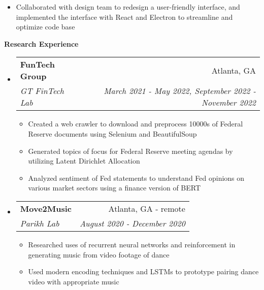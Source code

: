 \documentclass[letterpaper,10pt]{article}
\makeatletter
\newcommand{\resitem}[1]{\item #1 \vspace{-3.5pt}}
\newcommand{\resheading}[1]{{\large \colorbox{mygrey}{\begin{minipage}{\textwidth}{\textbf{#1 \vphantom{p\^{E}}}}\end{minipage}}}}
\newcommand{\ressubheading}[4]{
\begin{tabular*}{7.0in}{l@{\extracolsep{\fill}}r}
		\textbf{#1} & #2 \\
		\textit{#3} & \textit{#4} \\
\end{tabular*}\vspace{-6pt}}
\makeatother
\begin{document}
\begin{itemize}
\begin{itemize}
        \resitem{Collaborated with design team to redesign a user-friendly interface, and implemented the interface with React and Electron to streamline and optimize code base}
    \end{itemize}
\end{itemize}


\resheading{Research Experience}
\begin{itemize}
\item
    \ressubheading{FunTech Group}{Atlanta, GA}{GT FinTech Lab}{March 2021 - May 2022, September 2022 - November 2022}
    \begin{itemize}
        \resitem{Created a web crawler to download and preprocess 10000s of Federal Reserve documents using Selenium and BeautifulSoup}
        \resitem{Generated topics of focus for Federal Reserve meeting agendas by utilizing Latent Dirichlet Allocation}
        \resitem{Analyzed sentiment of Fed statements to understand Fed opinions on various market sectors using a finance version of BERT}
    \end{itemize}
\item
    \ressubheading{Move2Music}{Atlanta, GA - remote}{Parikh Lab}{August 2020 - December 2020}
    \begin{itemize}
        \resitem{Researched uses of recurrent neural networks and reinforcement in generating music from video footage of dance}
        \resitem{Used modern encoding techniques and LSTMs to prototype pairing dance video with appropriate music}
    \end{itemize}
\end{itemize}
\end{document}
